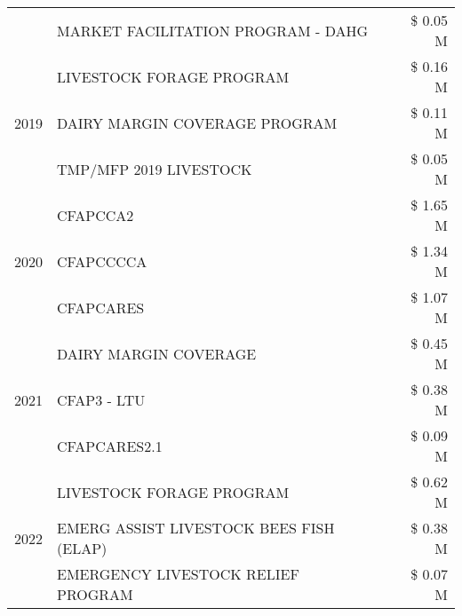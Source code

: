 \begin{tabular}{llr}
 & MARKET FACILITATION PROGRAM - DAHG & \$ 0.05 M \\
\cline{1-3}
\multirow[t]{3}{*}{2019} & LIVESTOCK FORAGE PROGRAM & \$ 0.16 M \\
 & DAIRY MARGIN COVERAGE PROGRAM & \$ 0.11 M \\
 & TMP/MFP 2019 LIVESTOCK & \$ 0.05 M \\
\cline{1-3}
\multirow[t]{3}{*}{2020} & CFAPCCA2 & \$ 1.65 M \\
 & CFAPCCCCA & \$ 1.34 M \\
 & CFAPCARES & \$ 1.07 M \\
\cline{1-3}
\multirow[t]{3}{*}{2021} & DAIRY MARGIN COVERAGE & \$ 0.45 M \\
 & CFAP3 - LTU & \$ 0.38 M \\
 & CFAPCARES2.1 & \$ 0.09 M \\
\cline{1-3}
\multirow[t]{3}{*}{2022} & LIVESTOCK FORAGE PROGRAM & \$ 0.62 M \\
 & EMERG ASSIST LIVESTOCK BEES FISH (ELAP) & \$ 0.38 M \\
 & EMERGENCY LIVESTOCK RELIEF PROGRAM & \$ 0.07 M \\
\cline{1-3}
\bottomrule
\end{tabular}
